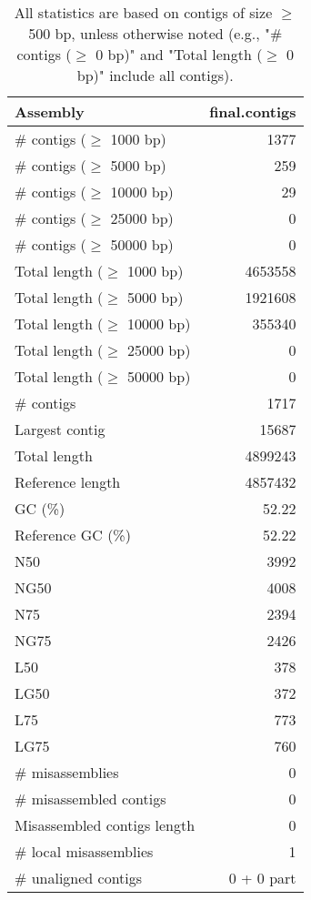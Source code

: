 \documentclass[12pt,a4paper]{article}
\begin{document}
\begin{table}[ht]
\begin{center}
\caption{All statistics are based on contigs of size $\geq$ 500 bp, unless otherwise noted (e.g., "\# contigs ($\geq$ 0 bp)" and "Total length ($\geq$ 0 bp)" include all contigs).}
\begin{tabular}{|l*{1}{|r}|}
\hline
Assembly & final.contigs \\ \hline
\# contigs ($\geq$ 1000 bp) & 1377 \\ \hline
\# contigs ($\geq$ 5000 bp) & 259 \\ \hline
\# contigs ($\geq$ 10000 bp) & 29 \\ \hline
\# contigs ($\geq$ 25000 bp) & 0 \\ \hline
\# contigs ($\geq$ 50000 bp) & 0 \\ \hline
Total length ($\geq$ 1000 bp) & 4653558 \\ \hline
Total length ($\geq$ 5000 bp) & 1921608 \\ \hline
Total length ($\geq$ 10000 bp) & 355340 \\ \hline
Total length ($\geq$ 25000 bp) & 0 \\ \hline
Total length ($\geq$ 50000 bp) & 0 \\ \hline
\# contigs & 1717 \\ \hline
Largest contig & 15687 \\ \hline
Total length & 4899243 \\ \hline
Reference length & 4857432 \\ \hline
GC (\%) & 52.22 \\ \hline
Reference GC (\%) & 52.22 \\ \hline
N50 & 3992 \\ \hline
NG50 & 4008 \\ \hline
N75 & 2394 \\ \hline
NG75 & 2426 \\ \hline
L50 & 378 \\ \hline
LG50 & 372 \\ \hline
L75 & 773 \\ \hline
LG75 & 760 \\ \hline
\# misassemblies & 0 \\ \hline
\# misassembled contigs & 0 \\ \hline
Misassembled contigs length & 0 \\ \hline
\# local misassemblies & 1 \\ \hline
\# unaligned contigs & 0 + 0 part \\ \hline

\end{tabular}
\end{center}
\end{table}
\end{document}
